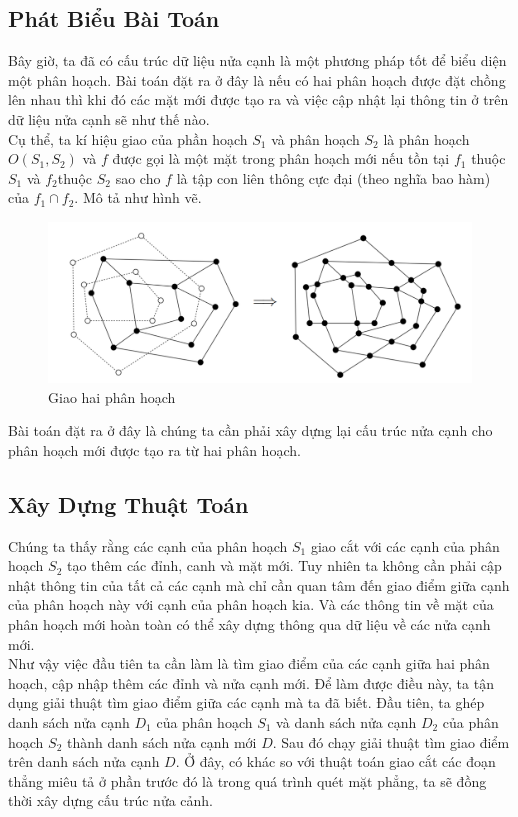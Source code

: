 \documentclass[15pt]{article}
\begin{document}
\subsection{Phát Biểu Bài Toán}
Bây giờ, ta đã có cấu trúc dữ liệu nửa cạnh là một phương pháp tốt để biểu diện một phân hoạch. Bài toán đặt ra ở đây là nếu có hai phân hoạch được đặt chồng lên nhau thì khi đó các mặt mới được tạo ra và việc cập nhật lại thông tin ở trên dữ liệu nửa cạnh sẽ như thế nào. \\

Cụ thể, ta kí hiệu giao của phần hoạch $S_1$ và phân hoạch $S_2$ là phân hoạch $O(S_1, S_2)$ và $f$ được gọi là một mặt trong phân hoạch mới nếu tồn tại $f_1$ thuộc $S_1$ và $f_2$thuộc $S_2$ sao cho $f$ là tập con liên thông cực đại (theo nghĩa bao hàm) của $f_1 \cap f_2$. Mô tả như hình vẽ.\\

\begin{figure}[h!]
\centering
\includegraphics[scale=0.5]{./mapoverlay_example.png}
\caption{Giao hai phân hoạch}
\label{fig: giao hai phân hoạch}
\end{figure}

Bài toán đặt ra ở đây là chúng ta cần phải xây dựng lại cấu trúc nửa cạnh cho phân hoạch mới được tạo ra từ hai phân hoạch.

\subsection{Xây Dựng Thuật Toán}
Chúng ta thấy rằng các cạnh của phân hoạch $S_1$ giao cắt với các cạnh của phân hoạch $S_2$ tạo thêm các đỉnh, canh và mặt mới. Tuy nhiên ta không cần phải cập nhật thông tin của tất cả các cạnh mà chỉ cần quan tâm đến giao điểm giữa cạnh của phân hoạch này với cạnh của phân hoạch kia. Và các thông tin về mặt của phân hoạch mới hoàn toàn có thể xây dựng thông qua dữ liệu về các nửa cạnh mới. \\

Như vậy việc đầu tiên ta cần làm là tìm giao điểm của các cạnh giữa hai phân hoạch, cập nhập thêm các đỉnh và nửa cạnh mới. Để làm được điều này, ta tận dụng giải thuật tìm giao điểm giữa các cạnh mà ta đã biết. Đầu tiên, ta ghép danh sách nửa cạnh $D_1$ của phân hoạch $S_1$ và danh sách nửa cạnh $D_2$ của phân hoạch $S_2$ thành danh sách nửa cạnh mới $D$. Sau đó chạy giải thuật tìm giao điểm trên danh sách nửa cạnh $D$. Ở đây, có khác so với thuật toán giao cắt các đoạn thẳng miêu tả ở phần trước đó là trong quá trình quét mặt phẳng, ta sẽ đồng thời xây dựng cấu trúc nửa cảnh. \\
\end{document}
